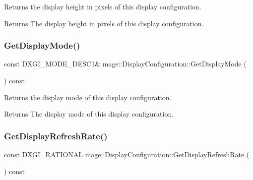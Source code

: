 Returns the display height in pixels of this display configuration.

\begin{DoxyReturn}{Returns}
The display height in pixels of this display configuration. 
\end{DoxyReturn}
\hypertarget{structmage_1_1_display_configuration_a20270be6a17deab929fce25596edabd4}{}\label{structmage_1_1_display_configuration_a20270be6a17deab929fce25596edabd4} 
\subsubsection{\texorpdfstring{Get\+Display\+Mode()}{GetDisplayMode()}}
{\footnotesize\ttfamily const D\+X\+G\+I\+\_\+\+M\+O\+D\+E\+\_\+\+D\+E\+S\+C1\& mage\+::\+Display\+Configuration\+::\+Get\+Display\+Mode (\begin{DoxyParamCaption}{ }\end{DoxyParamCaption}) const\hspace{0.3cm}{\ttfamily [noexcept]}}

Returns the display mode of this display configuration.

\begin{DoxyReturn}{Returns}
The display mode of this display configuration. 
\end{DoxyReturn}
\hypertarget{structmage_1_1_display_configuration_aa92237613f8077d189f9504fec371cb8}{}\label{structmage_1_1_display_configuration_aa92237613f8077d189f9504fec371cb8} 
\subsubsection{\texorpdfstring{Get\+Display\+Refresh\+Rate()}{GetDisplayRefreshRate()}}
{\footnotesize\ttfamily const D\+X\+G\+I\+\_\+\+R\+A\+T\+I\+O\+N\+AL mage\+::\+Display\+Configuration\+::\+Get\+Display\+Refresh\+Rate (\begin{DoxyParamCaption}{ }\end{DoxyParamCaption}) const\hspace{0.3cm}{\ttfamily [noexcept]}}

